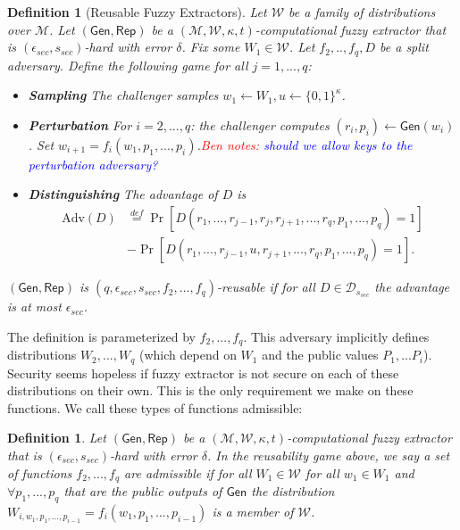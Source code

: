 \documentclass[11pt]{article}
\newtheorem{definition}[theorem]{Definition}
\newcommand{\class}[1]{{\ensuremath{\mathsf{#1}}}}
\newcommand{\gen}{\ensuremath{\class{Gen}}\xspace}
\newcommand{\rep}{\ensuremath{\class{Rep}}\xspace}
\newcommand{\zo}{\ensuremath{\{0, 1\}}}
\newcommand{\authnote}[2]{{\textcolor{red}{\textsf{#1 notes: }\textcolor{blue}{ #2}}\marginpar{\textcolor{red}{\textbf{!!!!!}}}}}
\newcommand{\authnote}[2]{}
\newcommand{\bnote}[1]{{\authnote{Ben}{#1}}}
\begin{document}
\begin{definition}[Reusable Fuzzy Extractors]
\label{def:outsider fuzz ext}
Let $\mathcal{W}$ be a family of distributions over $\mathcal{M}$.  Let $(\gen, \rep)$ be a $(\mathcal{M}, \mathcal{W}, \kappa, t)$-computational fuzzy extractor that is $(\epsilon_{sec}, s_{sec})$-hard with error $\delta$.
Fix some $W_1 \in \mathcal{W}$.  Let $f_2,.., f_q , D$ be a split adversary.  Define the following game for all $j=1,..., q$:
\begin{itemize}%
\item \textbf{Sampling} The challenger samples $w_1\leftarrow W_1, u\leftarrow \zo^\kappa$.
\item \textbf{Perturbation} For $i=2,..., q$: the challenger computes $(r_i, p_i)\leftarrow \gen(w_i)$.  Set $w_{i+1} = f_i(w_1, p_1,..., p_i)$.\bnote{should we allow keys to the perturbation adversary?}
\item \textbf{Distinguishing} The advantage of $D$ is
\begin{align*}
\text{Adv}(D)&\overset{def}= \Pr[D(r_1,..., r_{j-1}, r_j, r_{j+1},..., r_q, p_1,..., p_q)=1]\\ &- \Pr[D(r_1,..., r_{j-1}, u, r_{j+1},..., r_q, p_1,..., p_q)=1].
\end{align*}
\end{itemize}
$(\gen, \rep)$ is $(q, \epsilon_{sec}, s_{sec}, f_2,..., f_q)$-reusable if for all $D\in\mathcal{D}_{s_{sec}}$ the advantage is at most $\epsilon_{sec}$.
\end{definition}

The definition is parameterized by $f_2,..., f_q$.  This adversary implicitly defines distributions $W_2,..., W_q$ (which depend on $W_1$ and the public values $P_1,... P_i$).  Security seems hopeless if fuzzy extractor is not secure on each of these distributions on their own.  This is the only requirement we make on these functions.  We call these types of functions admissible:

\begin{definition}
Let $(\gen, \rep)$ be a $(\mathcal{M}, \mathcal{W}, \kappa, t)$-computational fuzzy extractor that is $(\epsilon_{sec}, s_{sec})$-hard with error $\delta$.  In the reusability game above, we say a set of functions $f_2,..., f_q$ are \emph{admissible} if for all $W_1\in \mathcal{W}$ for all $w_1\in W_1$ and $\forall p_1,..., p_q$ that are the public outputs of $\gen$ the distribution $W_{i,w_1,p_1,..., p_{i-1}} = f_i(w_1,p_1,..., p_{i-1})$ is a member of $\mathcal{W}$.
\end{definition}
\end{document}
